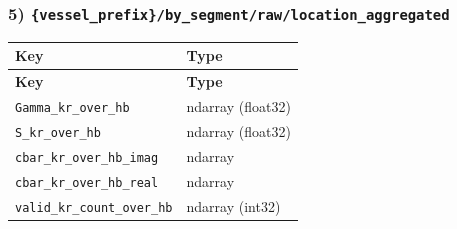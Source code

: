 \documentclass[11pt]{article}
\begin{document}
\subsubsection*{5) \texttt{\{vessel\_\allowbreak{}prefix\}/\allowbreak{}by\_\allowbreak{}segment/\allowbreak{}raw/\allowbreak{}location\_\allowbreak{}aggregated}}
\begin{longtable}{|p{}|p{}|}
\hline
\textbf{Key} & \textbf{Type} \\ \hline
\endfirsthead
\hline
\textbf{Key} & \textbf{Type} \\ \hline
\endhead
\texttt{Gamma\_\allowbreak{}kr\_\allowbreak{}over\_\allowbreak{}hb} & ndarray (float32) \\ \hline
\texttt{S\_\allowbreak{}kr\_\allowbreak{}over\_\allowbreak{}hb} & ndarray (float32) \\ \hline
\texttt{cbar\_\allowbreak{}kr\_\allowbreak{}over\_\allowbreak{}hb\_\allowbreak{}imag} & ndarray \\ \hline
\texttt{cbar\_\allowbreak{}kr\_\allowbreak{}over\_\allowbreak{}hb\_\allowbreak{}real} & ndarray \\ \hline
\texttt{valid\_\allowbreak{}kr\_\allowbreak{}count\_\allowbreak{}over\_\allowbreak{}hb} & ndarray (int32) \\ \hline
\end{longtable}
\end{document}
